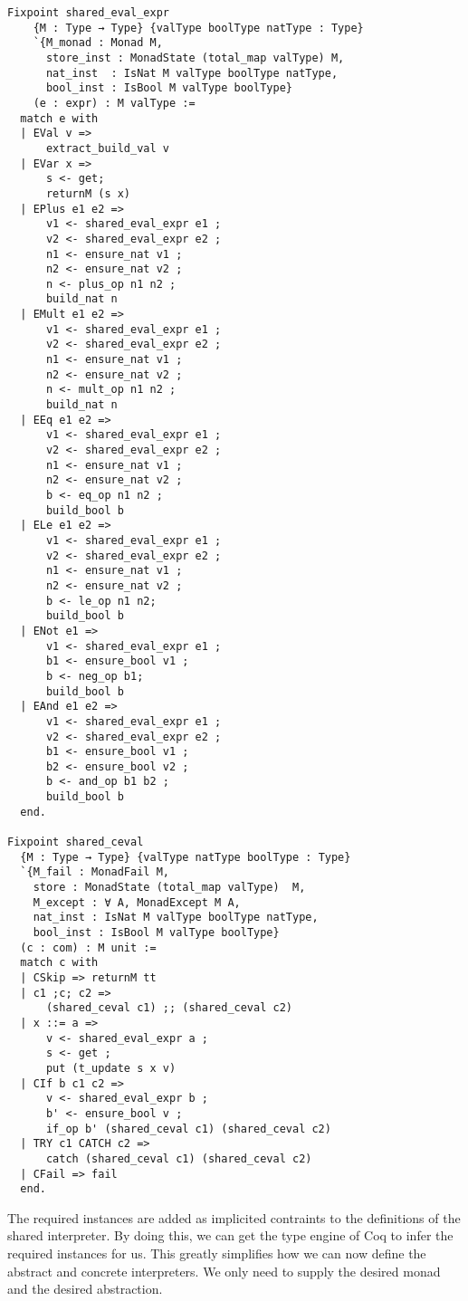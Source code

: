 {\begin{verbatim}
Fixpoint shared_eval_expr 
    {M : Type → Type} {valType boolType natType : Type}
    `{M_monad : Monad M, 
      store_inst : MonadState (total_map valType) M,
      nat_inst  : IsNat M valType boolType natType, 
      bool_inst : IsBool M valType boolType}
    (e : expr) : M valType :=
  match e with
  | EVal v =>
      extract_build_val v
  | EVar x =>
      s <- get;
      returnM (s x)
  | EPlus e1 e2 => 
      v1 <- shared_eval_expr e1 ;
      v2 <- shared_eval_expr e2 ;
      n1 <- ensure_nat v1 ;
      n2 <- ensure_nat v2 ;
      n <- plus_op n1 n2 ;
      build_nat n
  | EMult e1 e2 => 
      v1 <- shared_eval_expr e1 ;
      v2 <- shared_eval_expr e2 ;
      n1 <- ensure_nat v1 ;
      n2 <- ensure_nat v2 ;
      n <- mult_op n1 n2 ;
      build_nat n
  | EEq e1 e2 =>
      v1 <- shared_eval_expr e1 ;
      v2 <- shared_eval_expr e2 ;
      n1 <- ensure_nat v1 ;
      n2 <- ensure_nat v2 ;
      b <- eq_op n1 n2 ;
      build_bool b
  | ELe e1 e2 =>
      v1 <- shared_eval_expr e1 ;
      v2 <- shared_eval_expr e2 ;
      n1 <- ensure_nat v1 ;
      n2 <- ensure_nat v2 ;
      b <- le_op n1 n2;
      build_bool b
  | ENot e1 =>
      v1 <- shared_eval_expr e1 ;
      b1 <- ensure_bool v1 ;
      b <- neg_op b1;
      build_bool b
  | EAnd e1 e2 =>
      v1 <- shared_eval_expr e1 ;
      v2 <- shared_eval_expr e2 ;
      b1 <- ensure_bool v1 ;
      b2 <- ensure_bool v2 ;
      b <- and_op b1 b2 ;
      build_bool b
  end.
  
Fixpoint shared_ceval 
  {M : Type → Type} {valType natType boolType : Type}
  `{M_fail : MonadFail M, 
    store : MonadState (total_map valType)  M, 
    M_except : ∀ A, MonadExcept M A, 
    nat_inst : IsNat M valType boolType natType, 
    bool_inst : IsBool M valType boolType}
  (c : com) : M unit :=
  match c with
  | CSkip => returnM tt
  | c1 ;c; c2 =>
      (shared_ceval c1) ;; (shared_ceval c2)
  | x ::= a => 
      v <- shared_eval_expr a ;
      s <- get ;
      put (t_update s x v)
  | CIf b c1 c2 => 
      v <- shared_eval_expr b ;
      b' <- ensure_bool v ;
      if_op b' (shared_ceval c1) (shared_ceval c2)
  | TRY c1 CATCH c2 => 
      catch (shared_ceval c1) (shared_ceval c2)
  | CFail => fail
  end.
\end{verbatim}

The required instances are added as implicited contraints to the definitions of
the shared interpreter. By doing this, we can get the type engine of Coq to
infer the required instances for us. This greatly simplifies how we can now
define the abstract and concrete interpreters. We only need to supply the
desired monad and the desired abstraction.

}
